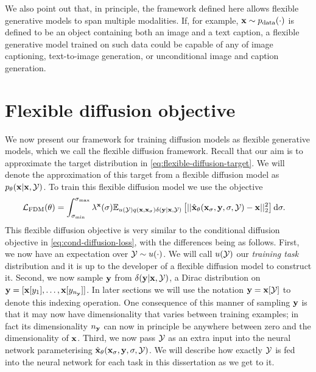 We also point out that, in principle, the framework defined here allows flexible generative models to span multiple modalities. If, for example, ${\mathbf{x}} \sim p_{\rm{data}}(\cdot)$ is defined to be an object containing both an image and a text caption, a flexible generative model trained on such data could be capable of any of image captioning, text-to-image generation, or unconditional image and caption generation.

\section{Flexible diffusion objective}

We now present our framework for training diffusion models as flexible generative models, which we call the flexible diffusion framework. Recall that our aim is to approximate the target distribution in \cref{eq:flexible-diffusion-target}. We will denote the approximation of this target from a flexible diffusion model as $p_\theta({\mathbf{x}}|{\mathbf{x}},{\mathcal{Y}})$. To train this flexible diffusion model we use the objective
\begin{align} \label{eq:flexible-diffusion-loss}
    \mathcal{L}_\text{FDM}(\theta) &= \int_{\sigma_\text{min}}^{\sigma_\text{max}} \lambda^{\mathbf{x}}(\sigma) \mathbb{E}_{u({\mathcal{Y}})q({\mathbf{x}}, {\mathbf{x}}_\sigma)\delta({\mathbf{y}}|{\mathbf{x}},{\mathcal{Y}})} \left[ 
    || \hat{{\mathbf{x}}}_\theta({\mathbf{x}}_\sigma, {\mathbf{y}}, \sigma, {\mathcal{Y}}) - {\mathbf{x}} ||_2^2 \right] \mathrm{d}\sigma.
\end{align}
This flexible diffusion objective is very similar to the conditional diffusion objective in \cref{eq:cond-diffusion-loss}, with the differences being as follows. First, we now have an expectation over ${\mathcal{Y}} \sim u(\cdot)$. We will call $u({\mathcal{Y}})$ our \textit{training task} distribution and it is up to the developer of a flexible diffusion model to construct it. Second, we now sample ${\mathbf{y}}$ from $\delta({\mathbf{y}}|{\mathbf{x}},{\mathcal{Y}})$, a Dirac distribution on ${\mathbf{y}} = [ {\mathbf{x}}[y_1], \ldots, {\mathbf{x}}[y_{n_{\mathbf{y}}}] ]$. In later sections we will use the notation ${\mathbf{y}} = {\mathbf{x}}[{\mathcal{Y}}]$ to denote this indexing operation. One consequence of this manner of sampling ${\mathbf{y}}$ is that it may now have dimensionality that varies between training examples; in fact its dimensionality $n_{\mathbf{y}}$ can now in principle be anywhere between zero and the dimensionality of ${\mathbf{x}}$. Third, we now pass ${\mathcal{Y}}$ as an extra input into the neural network parameterising $\hat{{\mathbf{x}}}_\theta({\mathbf{x}}_\sigma, {\mathbf{y}}, \sigma, {\mathcal{Y}})$. We will describe how exactly ${\mathcal{Y}}$ is fed into the neural network for each task in this dissertation as we get to it.


